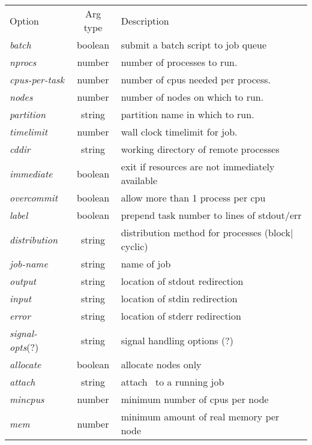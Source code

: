 \begin{table}[htb]
\begin{center}
  \begin{tabular}[t]{lcl}
   \hhline{---}
      Option & Arg type & Description \\
   \hhline{---}
      {\em batch}	   & boolean& submit a batch script to job queue      \\
      {\em nprocs}         & number & number of processes to run.  	      \\
      {\em cpus-per-task } & number & number of cpus needed per process.      \\
      {\em nodes}	   & number & number of nodes on which to run.	      \\
      {\em partition}	   & string & partition name in which to run.         \\
      {\em timelimit}	   & number & wall clock timelimit for job.           \\
      {\em cddir}	   & string & working directory of remote processes   \\
      {\em immediate}	   & boolean& exit if resources are not immediately available  \\
      {\em overcommit}     & boolean& allow more than 1 process per cpu	      \\
      {\em label}	   & boolean& prepend task number to lines of stdout/err \\
      {\em distribution}   & string & distribution method for processes (block$|$cyclic) \\
      {\em job-name}	   & string & name of job 			      \\
      {\em output}         & string & location of stdout redirection	      \\
      {\em input}	   & string & location of stdin redirection	      \\
      {\em error}	   & string & location of stderr redirection	      \\
      {\em signal-opts}(?) & string & signal handling options (?)	      \\
      {\em allocate}	   & boolean& allocate nodes only		      \\
      {\em attach}	   & string & attach \srun\ to a running job	      \\
      {\em mincpus} 	   & number & minimum number of cpus per node         \\
      {\em mem}		   & number & minimum amount of real memory per node  \\

\end{tabular}
\end{center}
\end{table}
